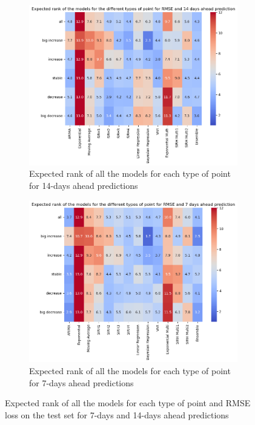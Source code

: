 \begin{figure}[htbp]
    \centering
    \begin{subfigure}[b]{0.45\textwidth}
        \centering
        \includegraphics[width=\textwidth]{figures/heatmap_esb_14.png}
        \caption{Expected rank of all the models for each type of point for 14-days ahead predictions}
        \label{fig:heatmap_esb_14}
    \end{subfigure}
    \hfill
    \begin{subfigure}[b]{0.45\textwidth}
        \centering
        \includegraphics[width=\textwidth]{figures/heatmap_esb_7.png}
        \caption{Expected rank of all the models for each type of point for 7-days ahead predictions}
        \label{fig:heatmap_esb_7}
    \end{subfigure}
    \caption{Expected rank of all the models for each type of point and RMSE loss on the test set for 7-days and 14-days ahead predictions}
    \label{fig:heatmap_esb_comparison}
\end{figure}

